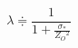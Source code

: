 \begin{equation}
\label{e4:24}
\lambda \doteqdot \frac{1}{\displaystyle 1+\frac{\sigma_{\ast}}{Z_O{}^2}}
\end{equation}

